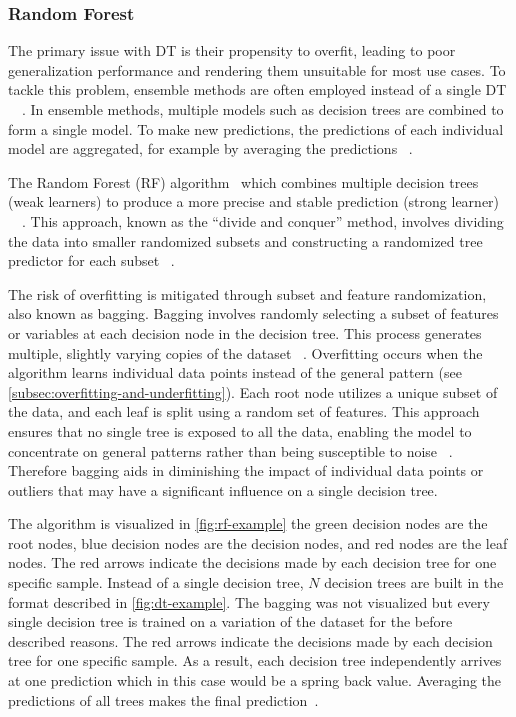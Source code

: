 \subsubsection{Random Forest}\label{subsubsec:random-forests}
The primary issue with DT is their propensity to overfit, leading to poor generalization
performance and rendering them unsuitable for most use cases.
To tackle this problem, ensemble methods are often employed instead of a single
DT
~\cite[p. 83]{muller2016introduction}~\cite[p. 251]{liu2012new}.
In ensemble methods, multiple models such as decision trees are combined to form a single model.
To make new predictions, the predictions of each individual model are aggregated, for example by averaging the
predictions
~\cite[p. 222]{boehmke2019hands}.

The Random Forest (RF) algorithm~\cite[]{breiman2001random} which combines multiple decision trees (weak
learners) to produce a more precise and stable prediction (strong learner)
~\cite[p. 24]{awad2015efficient}~\cite[pp. 340]{gareth2013introduction}.
This approach, known as the ``divide and conquer'' method, involves dividing the data into smaller randomized subsets
and constructing a randomized tree predictor for each subset
~\cite[p. 251]{liu2012new}.

The risk of overfitting is mitigated through subset and feature randomization, also known as bagging.
Bagging involves randomly selecting a subset of features or variables at each decision node in the decision
tree.
This process generates multiple, slightly varying copies of the dataset
~\cite[p. 341]{gareth2013introduction}.
Overfitting occurs when the algorithm learns individual data points instead of
the general pattern (see \cref{subsec:overfitting-and-underfitting}).
Each root node utilizes a unique subset of the data, and each leaf is split using a random set of features.
This approach ensures that no single tree is exposed to all the data, enabling the model to concentrate on general
patterns rather than being susceptible to noise
~\cite[p. 83]{muller2016introduction}.
Therefore bagging aids in diminishing the impact of individual data points or outliers that may have a
significant influence on a single decision tree.

The algorithm is visualized in \cref{fig:rf-example} the green decision nodes are the root nodes, blue decision nodes
are the decision nodes, and red nodes are the leaf nodes.
The red arrows indicate the decisions made by each decision tree for one specific sample.
Instead of a single decision tree, $N$ decision trees are built in the format described in \cref{fig:dt-example}.
The bagging was not visualized but every single decision tree is trained on a variation of the dataset for the before
described reasons.
The red arrows indicate the decisions made by each decision tree for one specific sample.
As a result, each decision tree independently arrives at one prediction which in this case would be a spring back value.
Averaging the predictions of all trees makes the final prediction~\cite[p. 9]{breiman2001random}.

